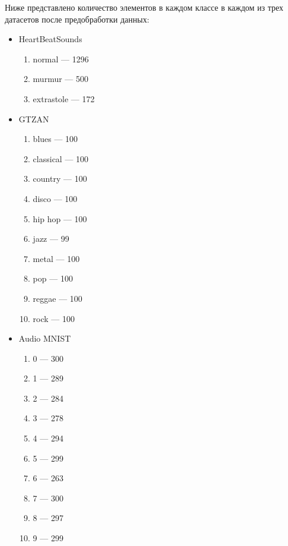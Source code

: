 \documentclass[12pt, fleqn]{article}
\begin{document}
Ниже представлено количество элементов в каждом классе в каждом из трех датасетов после предобработки данных:

\begin{itemize}
    \item HeartBeatSounds ~\cite{HeartbeatSoundsArticle}~\cite{HeartbeatSoundsKaggle}
    \begin{enumerate}
        \item normal --- 1296
        \item murmur --- 500
        \item extrastole --- 172
    \end{enumerate}
    \item GTZAN ~\cite{GTZAN_Article}~\cite{GTZAN_kaggle}
    \begin{enumerate}
        \item blues --- 100
        \item classical --- 100
        \item country --- 100
        \item disco --- 100
        \item hip hop --- 100
        \item jazz --- 99
        \item metal --- 100
        \item pop --- 100
        \item reggae --- 100
        \item rock --- 100
    \end{enumerate}
    \item Audio MNIST ~\cite{AudioMnistArticle}~\cite{AudioMnistKaggle}
    \begin{enumerate}
        \item 0 --- 300
        \item 1 --- 289
        \item 2 --- 284
        \item 3 --- 278
        \item 4 --- 294
        \item 5 --- 299
        \item 6 --- 263
        \item 7 --- 300
        \item 8 --- 297
        \item 9 --- 299
    \end{enumerate}
\end{itemize}
\end{document}
